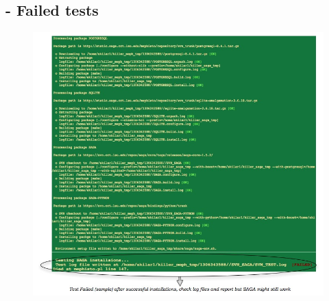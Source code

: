 \documentclass[a4paper,10pt]{article}
\begin{document}
\subsection*{- Failed tests}
\begin{figure}[H]
\begin{center}
\includegraphics[scale=0.60]{test_fail.jpg}
\end{center}
\end{figure}
\end{document}
